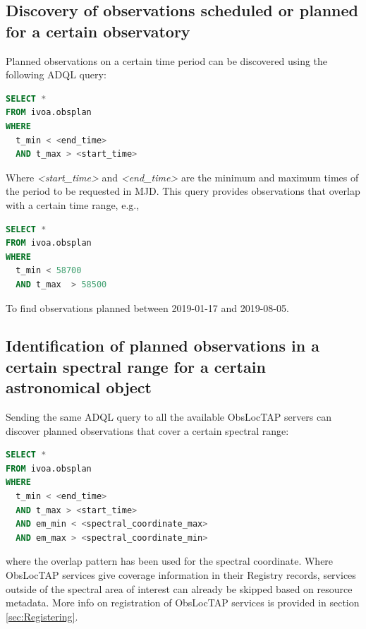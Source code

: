 \documentclass[11pt,a4paper]{ivoa}
\begin{document}
\subsection{Discovery of observations scheduled or planned for a certain
observatory}
Planned observations on a certain time period can be discovered using the
following ADQL query:

\begin{lstlisting}[language=SQL]
SELECT * 
FROM ivoa.obsplan 
WHERE
  t_min < <end_time>
  AND t_max > <start_time>
\end{lstlisting}
Where \textit{<start\_time>} and \textit{<end\_time> }are the minimum and
maximum times of the period to be requested in MJD. This query provides
observations that overlap with a certain time range, e.g.,

\begin{lstlisting}[language=SQL]
SELECT *
FROM ivoa.obsplan
WHERE
  t_min < 58700
  AND t_max  > 58500
\end{lstlisting}

To find observations planned between 2019-01-17 and 2019-08-05.

\subsection{Identification of planned observations in a certain spectral range
for a certain astronomical object}
Sending the same ADQL query to all the available ObsLocTAP servers can discover
planned observations that cover a certain spectral range:

\begin{lstlisting}[language=SQL]
SELECT *
FROM ivoa.obsplan
WHERE
  t_min < <end_time>
  AND t_max > <start_time>
  AND em_min < <spectral_coordinate_max>
  AND em_max > <spectral_coordinate_min>
\end{lstlisting}
where the overlap pattern has been used for the spectral coordinate.
Where ObsLocTAP services give coverage information in their Registry records,
services outside of the spectral area of interest can already be skipped based
on resource metadata. More info on registration of ObsLocTAP services is provided
in section \ref{sec:Registering}.
\par
\end{document}
